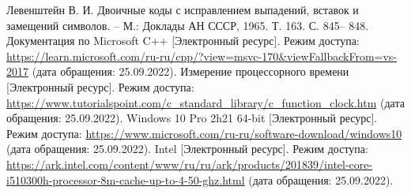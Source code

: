 \documentclass[a4paper,14pt, unknownkeysallowed]{bmstu}
\begin{document}
\begin{thebibliography}{5}
	Левенштейн В. И. Двоичные коды с исправлением выпадений, вставок и замещений символов. – М.: Доклады АН СССР, 1965. Т. 163. С. 845– 848.
	Документация по Microsoft C++ [Электронный ресурс]. Режим доступа: \url{https://learn.microsoft.com/ru-ru/cpp/?view=msvc-170&viewFallbackFrom=vs-2017} (дата обращения: 25.09.2022).
	Измерение процессорного времени [Электронный ресурс]. Режим доступа: \url{https://www.tutorialspoint.com/c_standard_library/c_function_clock.htm} (дата обращения: 25.09.2022).
	Windows 10 Pro 2h21 64-bit  [Электронный ресурс]. Режим доступа: \url{https://www.microsoft.com/ru-ru/software-download/windows10} (дата обращения: 25.09.2022).
	Intel [Электронный ресурс]. Режим доступа: \url{https://ark.intel.com/content/www/ru/ru/ark/products/201839/intel-core-i510300h-processor-8m-cache-up-to-4-50-ghz.html} (дата обращения: 25.09.2022).
\end{thebibliography}
\end{document}
